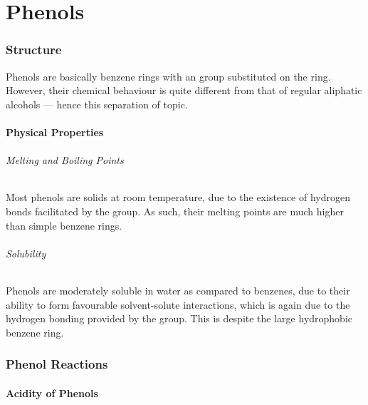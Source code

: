 

\pagebreak
\hypertarget{ChapterPhenols}{}
\part{Phenols}

	\section{Structure}

		Phenols are basically benzene rings with an  group substituted on the ring. However, their chemical behaviour is quite
		different from that of regular aliphatic alcohols --- hence this separation of topic.



		\subsection{Physical Properties}

			\paragraph{Melting and Boiling Points}

			Most phenols are solids at room temperature, due to the existence of hydrogen bonds facilitated by the  group. As such,
			their melting points are much higher than simple benzene rings.


			\paragraph{Solubility}

			Phenols are moderately soluble in water as compared to benzenes, due to their ability to form favourable solvent-solute
			interactions, which is again due to the hydrogen bonding provided by the  group. This is despite the large hydrophobic
			benzene ring.



	\section{Phenol Reactions}

		\subsection{Acidity of Phenols}

